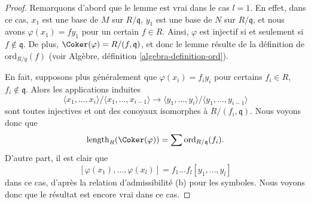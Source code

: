 \begin{proof}
Remarquons d'abord que le lemme est vrai dans le cas $l = 1$.
En effet, dans ce cas, $x_1$ est une base de $M$ sur $R/\mathfrak q$,
$y_1$ est une base de $N$ sur $R/\mathfrak q$, et nous avons
$\varphi(x_1) = fy_1$ pour un certain $f \in R$. Ainsi, $\varphi$ est injectif
si et seulement si $f \not \in \mathfrak q$. De plus,
$\Coker(\varphi) = R/(f, \mathfrak q)$, et donc le lemme
résulte de la définition de $\text{ord}_{R/q}(f)$
(voir Algèbre, définition \ref{algebra-definition-ord}).

\medskip\noindent
En fait, supposons plus généralement que $\varphi(x_i) = f_iy_i$ pour certains
$f_i \in R$, $f_i \not \in \mathfrak q$. Alors les applications induites
$$
\langle x_1, \ldots, x_i\rangle / \langle x_1, \ldots, x_{i - 1}\rangle
\longrightarrow
\langle y_1, \ldots, y_i\rangle / \langle y_1, \ldots, y_{i - 1}\rangle
$$
sont toutes injectives et ont des conoyaux isomorphes à
$R/(f_i, \mathfrak q)$. Nous voyons donc que
$$
\text{length}_R(\Coker(\varphi)) = \sum \text{ord}_{R/\mathfrak q}(f_i).
$$
D'autre part, il est clair que
$$
[\varphi(x_1), \ldots, \varphi(x_l)] = f_1 \ldots f_l [y_1, \ldots, y_l]
$$
dans ce cas, d'après la relation d'admissibilité (b) pour les symboles.
Nous voyons donc que le résultat est encore vrai dans ce cas.


\end{proof}
